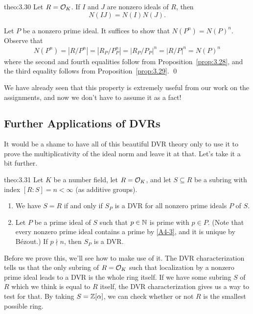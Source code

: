 \begin{theo}{theo:3.30}
    Let $R = {\cal O}_K$. If $I$ and $J$ are nonzero ideals of $R$, then 
    \[ N(IJ) = N(I) N(J). \] 
\end{theo}\vspace{-0.25cm}
\begin{pf}
    Let $P$ be a nonzero prime ideal. It suffices to show that $N(P^n) = N(P)^n$.
    Observe that 
    \begin{align*}
        N(P^n) = |R/P^n| 
        = |R_P/P_P^n|  
        = |R_P/P_P|^n 
        = |R/P|^n  
        = N(P)^n
    \end{align*}
    where the second and fourth equalities follow from Proposition~\ref{prop:3.28},
    and the third equality follows from Proposition~\ref{prop:3.29}. \qed 
\end{pf}\vspace{-0.25cm}

We have already seen that this property is extremely useful from our work on 
the assignments, and now we don't have to assume it as a fact!

\subsection{Further Applications of DVRs} \label{subsec:3.8}
It would be a shame to have all of this beautiful DVR theory only to 
use it to prove the multiplicativity of the ideal norm and leave it 
at that. Let's take it a bit further. 

\begin{theo}{theo:3.31}
    Let $K$ be a number field, let $R = {\cal O}_K$, and let $S \subseteq R$ 
    be a subring with index $[R : S] = n < \infty$ (as additive groups).
    \begin{enumerate}[(1)]
        \item We have $S = R$ if and only if $S_P$ is a DVR for all 
        nonzero prime ideals $P$ of $S$. 
        \item Let $P$ be a prime ideal of $S$ such that $p \in \mathbb{N}$ is prime 
        with $p \in P$. (Note that every nonzero prime ideal contains 
        a prime by \ref{A4-3}, and it is unique by B\'ezout.) If $p \nmid n$, 
        then $S_P$ is a DVR. 
    \end{enumerate}
\end{theo}\vspace{-0.25cm}
Before we prove this, we'll see how to make use of it. The 
DVR characterization tells us that the only subring of $R = {\cal O}_K$ 
such that localization by a nonzero prime ideal leads to a DVR is the whole ring itself. 
If we have some subring $S$ of $R$ which we think is equal to $R$ itself, 
the DVR characterization gives us a way to test for that. By taking $S = 
\mathbb{Z}[\alpha]$, we can check whether or not $R$ is the smallest possible ring. 


